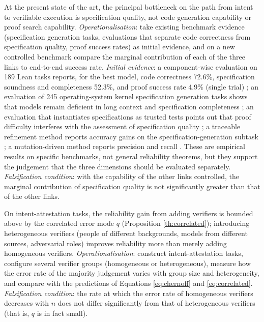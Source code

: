 \begin{hypothesis}\label{hyp:h7}
At the present state of the art, the principal bottleneck on the path from intent to
verifiable execution is specification quality, not code generation capability or proof
search capability.
\emph{Operationalisation}: take existing benchmark evidence (specification generation
tasks, evaluations that separate code correctness from specification quality, proof success
rates) as initial evidence, and on a new controlled benchmark compare the marginal
contribution of each of the three links to end-to-end success rate.
\emph{Initial evidence}: a component-wise evaluation on 189 Lean tasks reports, for the
best model, code correctness 72.6\%, specification soundness and completeness 52.3\%, and
proof success rate 4.9\% (single trial) \cite{verina2026}; an evaluation of 245
operating-system kernel specification generation tasks shows that models remain deficient
in long context and specification completeness \cite{osvbench2026}; an evaluation that
instantiates specifications as trusted tests points out that proof difficulty interferes
with the assessment of specification quality \cite{coins2026}; a traceable refinement
method reports accuracy gains on the specification-generation subtask
\cite{verispecgen2026}; a mutation-driven method reports precision and recall
\cite{specsyn2026}.
These are empirical results on specific benchmarks, not general reliability theorems, but
they support the judgement that the three dimensions should be evaluated separately.
\emph{Falsification condition}: with the capability of the other links controlled, the
marginal contribution of specification quality is not significantly greater than that of
the other links.
\end{hypothesis}

\begin{hypothesis}\label{hyp:h8}
On intent-attestation tasks, the reliability gain from adding verifiers is bounded above by
the correlated error mode $q$ (Proposition \ref{th:correlated}); introducing heterogeneous
verifiers (people of different backgrounds, models from different sources, adversarial
roles) improves reliability more than merely adding homogeneous verifiers.
\emph{Operationalisation}: construct intent-attestation tasks, configure several verifier
groups (homogeneous or heterogeneous), measure how the error rate of the majority judgement
varies with group size and heterogeneity, and compare with the predictions of Equations
\eqref{eq:chernoff} and \eqref{eq:correlated}.
\emph{Falsification condition}: the rate at which the error rate of homogeneous verifiers
decreases with $n$ does not differ significantly from that of heterogeneous verifiers (that
is, $q$ is in fact small).
\end{hypothesis}

